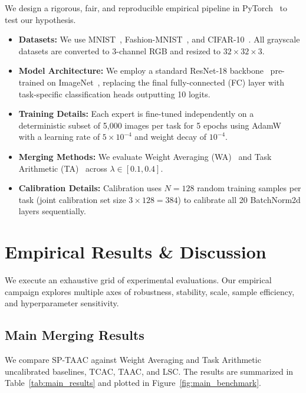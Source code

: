 \documentclass{article}
\theoremstyle{plain}
\theoremstyle{definition}
\theoremstyle{remark}
\begin{document}
We design a rigorous, fair, and reproducible empirical pipeline in PyTorch~\cite{paszke2019pytorch} to test our hypothesis.
\begin{itemize}
    \item \textbf{Datasets:} We use MNIST~\cite{lecun1998gradient}, Fashion-MNIST~\cite{xiao2017fashion}, and CIFAR-10~\cite{krizhevsky2009learning}. All grayscale datasets are converted to 3-channel RGB and resized to $32 \times 32 \times 3$.
    \item \textbf{Model Architecture:} We employ a standard ResNet-18 backbone~\cite{he2016deep} pre-trained on ImageNet~\cite{deng2009imagenet}, replacing the final fully-connected (FC) layer with task-specific classification heads outputting 10 logits.
    \item \textbf{Training Details:} Each expert is fine-tuned independently on a deterministic subset of 5,000 images per task for 5 epochs using AdamW~\cite{loshchilov2017decoupled} with a learning rate of $5 \times 10^{-4}$ and weight decay of $10^{-4}$.
    \item \textbf{Merging Methods:} We evaluate Weight Averaging (WA)~\cite{wortsman2022model} and Task Arithmetic (TA)~\cite{ilharco2022editing} across $\lambda \in [0.1, 0.4]$.
    \item \textbf{Calibration Details:} Calibration uses $N = 128$ random training samples per task (joint calibration set size $3 \times 128 = 384$) to calibrate all 20 BatchNorm2d layers sequentially.
\end{itemize}

\section{Empirical Results \& Discussion}
\label{sec:results}

We execute an exhaustive grid of experimental evaluations. Our empirical campaign explores multiple axes of robustness, stability, scale, sample efficiency, and hyperparameter sensitivity.

\subsection{Main Merging Results}
We compare SP-TAAC against Weight Averaging and Task Arithmetic uncalibrated baselines, TCAC, TAAC, and LSC. The results are summarized in Table~\ref{tab:main_results} and plotted in Figure~\ref{fig:main_benchmark}.
\end{document}
